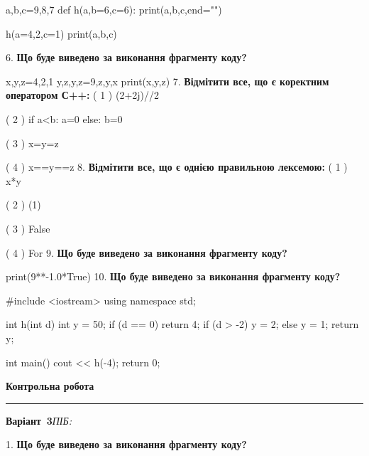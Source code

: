\documentclass[11pt]{article}
\begin{document}
a,b,c=9,8,7
def h(a,b=6,c=6):
    print(a,b,c,end="")

h(a=4,2,c=1)
print(a,b,c)

\vspace{5mm}
6. \textbf{Що буде виведено за виконання фрагменту коду?}

x,y,z=4,2,1
y,z,y,z=9,z,y,x
print(x,y,z)
\vspace{5mm}
7. %
\textbf{Відмітити все, що є коректним оператором С++:}
( 1 ) (2+2j)//2

( 2 ) if a<b: a=0 else: b=0

( 3 ) x=y=z

( 4 ) x==y==z
\vspace{5mm}
8. %
\textbf{Відмітити все, що є однією правильною лексемою:}
( 1 ) x*y

( 2 ) (1)

( 3 ) False

( 4 ) For
\vspace{5mm}
9. \textbf{Що буде виведено за виконання фрагменту коду?}

print(9**-1.0*True)
\vspace{5mm}
10. \textbf{Що буде виведено за виконання фрагменту коду?}

#include <iostream>
using namespace std;

int h(int d){
    int y = 50;
    if (d == 0) 
        return 4;
    if (d > -2)
         y = 2;
    else
         y = 1;
    return y;
}

int main(){
    cout << h(-4);
    return 0;
}

\vspace{5mm}










\newpage

\newpage

{\centering\Large\bfseries Контрольна робота\par}
\medskip
\noindent\rule{\linewidth}{0.5pt}
\smallskip
\noindent\textbf{Варіант \No\,3}\hfill \textit{ПІБ:}\,\underline{\hspace{60mm}}
\vspace{4mm}

1. \textbf{Що буде виведено за виконання фрагменту коду?}
\end{document}
